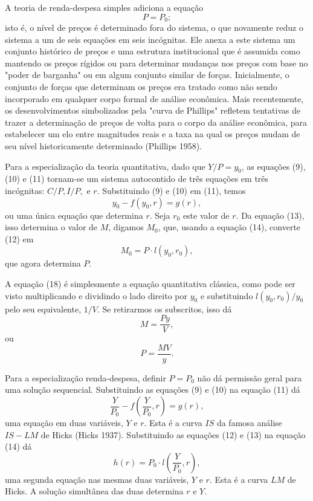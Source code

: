 \documentclass[12pt]{article}
\begin{document}
A teoria de renda-despesa simples adiciona a equação
\begin{equation}
P = P_0;
\end{equation}
isto é, o nível de preços é determinado fora do sistema, o que novamente reduz o sistema a um de seis equações em seis incógnitas. Ele anexa a este sistema um conjunto histórico de preços e uma estrutura institucional que é assumida como mantendo os preços rígidos ou para determinar mudanças nos preços com base no "poder de barganha" ou em algum conjunto similar de forças. Inicialmente, o conjunto de forças que determinam os preços era tratado como não sendo incorporado em qualquer corpo formal de análise econômica. Mais recentemente, os desenvolvimentos simbolizados pela "curva de Phillips" refletem tentativas de trazer a determinação de preços de volta para o corpo da análise econômica, para estabelecer um elo entre magnitudes reais e a taxa na qual os preços mudam de seu nível historicamente determinado (Phillips 1958).

Para a especialização da teoria quantitativa, dado que $Y/P = y_0$, as equações (9), (10) e (11) tornam-se um sistema autocontido de três equações em três incógnitas: $C/P, I/P,$ e $r$. Substituindo (9) e (10) em (11), temos
\begin{equation}
y_0 - f(y_0, r) = g(r),
\end{equation}
ou uma única equação que determina $r$. Seja $r_0$ este valor de $r$. Da equação (13), isso determina o valor de $M$, digamos $M_0$, que, usando a equação (14), converte (12) em
\begin{equation}
M_0 = P \cdot l(y_0, r_0),
\end{equation}
que agora determina $P$.

A equação (18) é simplesmente a equação quantitativa clássica, como pode ser visto multiplicando e dividindo o lado direito por $y_0$ e substituindo $l(y_0, r_0)/y_0$ pelo seu equivalente, $1/V$. Se retirarmos os subscritos, isso dá
\begin{equation}
M = \frac{Py}{V},
\end{equation}
ou
\begin{equation}
P = \frac{MV}{y}.
\end{equation}

Para a especialização renda-despesa, definir $P = P_0$ não dá permissão geral para uma solução sequencial. Substituindo as equações (9) e (10) na equação (11) dá
\begin{equation}
\frac{Y}{P_0} - f\left(\frac{Y}{P_0}, r\right) = g(r),
\end{equation}
uma equação em duas variáveis, $Y$ e $r$. Esta é a curva $IS$ da famosa análise $IS-LM$ de Hicks (Hicks 1937). Substituindo as equações (12) e (13) na equação (14) dá
\begin{equation}
h(r) = P_0 \cdot l\left(\frac{Y}{P_0}, r\right),
\end{equation}
uma segunda equação nas mesmas duas variáveis, $Y$ e $r$. Esta é a curva $LM$ de Hicks. A solução simultânea das duas determina $r$ e $Y$.
\end{document}
